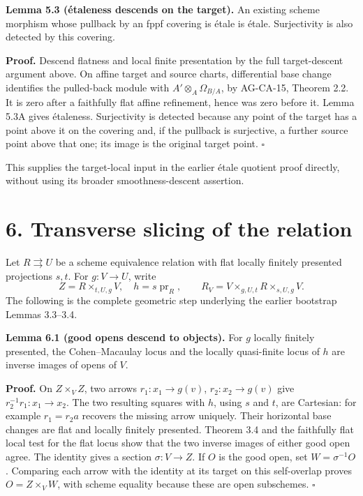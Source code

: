 \documentclass[11pt,a4paper,openany]{report}
\begin{document}
\textbf{Lemma 5.3 (étaleness descends on the target).} An existing scheme morphism whose pullback by an fppf covering is étale is étale. Surjectivity is also detected by this covering.

\textbf{Proof.} Descend flatness and local finite presentation by the full target-descent argument above. On affine target and source charts, differential base change identifies the pulled-back module with \(A'\otimes_A\Omega_{B/A}\), by AG-CA-15, Theorem 2.2. It is zero after a faithfully flat affine refinement, hence was zero before it. Lemma 5.3A gives étaleness. Surjectivity is detected because any point of the target has a point above it on the covering and, if the pullback is surjective, a further source point above that one; its image is the original target point. \(\square\)

This supplies the target-local input in the earlier étale quotient proof directly, without using its broader smoothness-descent assertion.

\section{6. Transverse slicing of the relation}\label{AG-RG-S07-transverse-slicing-of-the-relation}

Let \(R\rightrightarrows U\) be a scheme equivalence relation with flat locally finitely presented projections \(s,t\). For \(g:V\to U\), write \[
  Z=R\times_{t,U,g}V,\quad h=s\operatorname{pr}_R,\qquad
  R_V=V\times_{g,U,t}R\times_{s,U,g}V.
  \] The following is the complete geometric step underlying the earlier bootstrap Lemmas 3.3--3.4.

\textbf{Lemma 6.1 (good opens descend to objects).} For \(g\) locally finitely presented, the Cohen--Macaulay locus and the locally quasi-finite locus of \(h\) are inverse images of opens of \(V\).

\textbf{Proof.} On \(Z\times_V Z\), two arrows \(r_1:x_1\to g(v)\), \(r_2:x_2\to g(v)\) give \(r_2^{-1}r_1:x_1\to x_2\). The two resulting squares with \(h\), using \(s\) and \(t\), are Cartesian: for example \(r_1=r_2a\) recovers the missing arrow uniquely. Their horizontal base changes are flat and locally finitely presented. Theorem 3.4 and the faithfully flat local test for the flat locus show that the two inverse images of either good open agree. The identity gives a section \(\sigma:V\to Z\). If \(O\) is the good open, set \(W=\sigma^{-1}O\). Comparing each arrow with the identity at its target on this self-overlap proves \(O=Z\times_VW\), with scheme equality because these are open subschemes. \(\square\)
\end{document}

